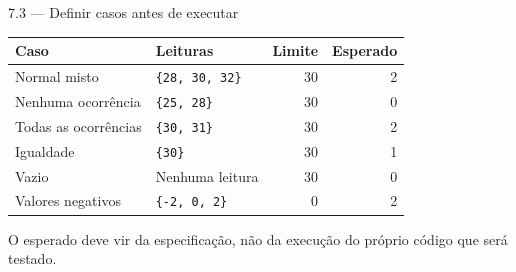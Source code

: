 \begin{frame}{7.3 — Definir casos antes de executar}
\small
\begin{tabularx}{\textwidth}{lXrr}
\toprule
Caso & Leituras & Limite & Esperado \\
\midrule
Normal misto & \texttt{\{28, 30, 32\}} & 30 & 2 \\
Nenhuma ocorrência & \texttt{\{25, 28\}} & 30 & 0 \\
Todas as ocorrências & \texttt{\{30, 31\}} & 30 & 2 \\
Igualdade & \texttt{\{30\}} & 30 & 1 \\
Vazio & Nenhuma leitura & 30 & 0 \\
Valores negativos & \texttt{\{-2, 0, 2\}} & 0 & 2 \\
\bottomrule
\end{tabularx}
\vspace{0.3cm}
O esperado deve vir da especificação, não da execução do próprio código que será testado.
\end{frame}
